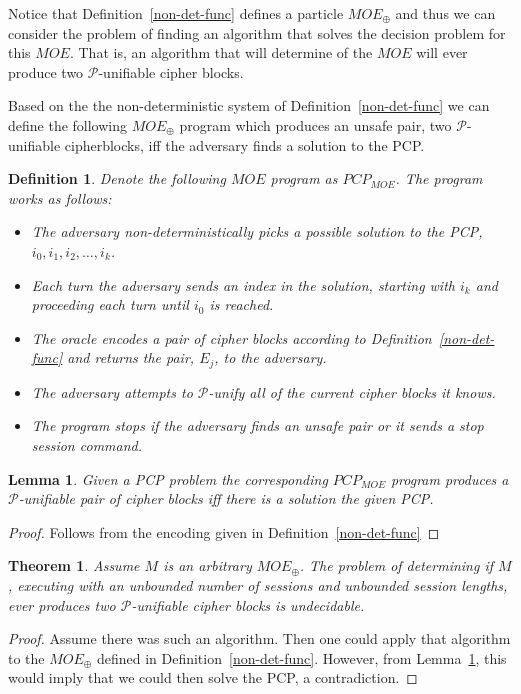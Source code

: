 \documentclass[11pt,twoside,a4paper]{article}
\newtheorem{definition}{Definition}
\newtheorem{theorem}{Theorem}
\newtheorem{lemma}{Lemma}
\begin{document}
Notice that Definition~\ref{non-det-func} defines a 
particle $MOE_{\oplus}$ and thus we can consider the problem 
of finding an algorithm that solves the decision problem for
this $MOE$. That is, an algorithm that will determine of 
the $MOE$ will ever produce two $\mathcal{P}$-unifiable
cipher blocks.

Based on the the non-deterministic system of 
Definition~\ref{non-det-func} we can define the following
$MOE_{\oplus}$ program which produces an unsafe pair, 
two $\mathcal{P}$-unifiable cipherblocks, iff the adversary
finds a solution to the PCP.

\begin{definition}
Denote the following $MOE$ program as $PCP_{MOE}$.
The program works as follows:
\begin{itemize}
	\item The adversary non-deterministically picks a possible
	solution to the PCP, $i_0, i_1, i_2, \ldots, i_k$.
	\item Each turn the adversary sends an index in the solution, 
	starting with $i_k$ and proceeding each turn until $i_0$ 
	is reached. 
	\item The oracle encodes a pair of cipher blocks according 
	to Definition~\ref{non-det-func} and returns the pair,
	$E_j$, to the adversary.
	\item The adversary attempts to $\mathcal{P}$-unify 
	all of the current cipher blocks it knows.
	\item The program stops if the adversary finds an unsafe
	pair or it sends a stop session command.
\end{itemize}
\end{definition}

\begin{lemma}\label{lemma:pcp_to_moe}
Given a PCP problem the corresponding $PCP_{MOE}$ program 
produces a $\mathcal{P}$-unifiable pair of cipher blocks
iff there is a solution the given PCP. 
\end{lemma}
\begin{proof}
Follows from the encoding given in Definition~\ref{non-det-func}
\end{proof}



\begin{theorem}
	Assume $M$ is an arbitrary $MOE_{\oplus}$. The problem
	of determining if $M$, executing with 
	an unbounded number of sessions and unbounded session
	lengths, ever produces two  $\mathcal{P}$-unifiable cipher blocks is undecidable. 
\end{theorem}
\begin{proof}
	Assume there was such an algorithm. Then one could apply that
	algorithm to the $MOE_{\oplus}$ defined in
	Definition~\ref{non-det-func}. However, 
	from Lemma~\ref{lemma:pcp_to_moe}, this would
	imply that we could then solve the PCP, a contradiction.   
\end{proof}
\end{document}
